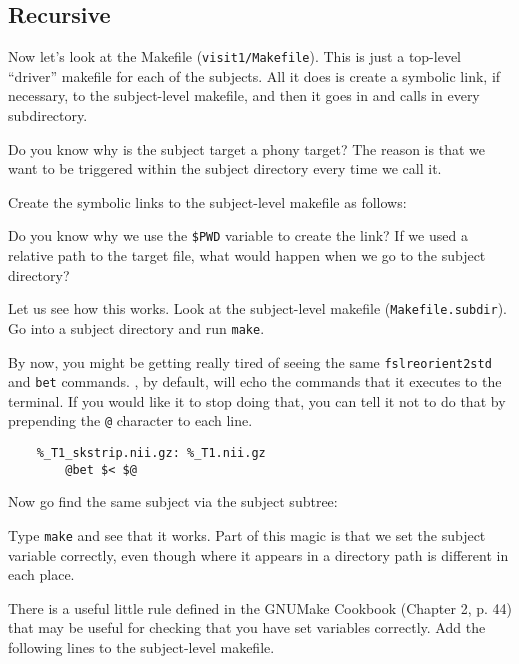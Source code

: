 \subsection{Recursive \maken{}}
Now let's look at the Makefile (\texttt{visit1/Makefile}).  This is just a 
top-level ``driver'' makefile for each of the subjects. All it does is
create a symbolic link, if necessary, to the subject-level makefile,
and then it goes in and calls \maken{} in every subdirectory.

Do you know why is the subject target a phony target? The reason is
that we want \maken{} to be triggered within the subject directory every
time we call it.

Create the symbolic links to the subject-level makefile as follows:

Do you know why we use the \texttt{\$PWD} variable to create the link?
If we used a relative path to the target file, what would happen when
we go to the subject directory?

Let us see how this works. Look at the subject-level makefile (\texttt{Makefile.subdir}). Go into
a subject directory and run \texttt{make}.

By now, you might be getting really tired of seeing the same \texttt{fslreorient2std} and \texttt{bet} commands. \maken{}, by default,
will echo the commands that it executes to the terminal. If you would
like it to stop doing that, you can tell it not to do that by
prepending the \texttt{@} character to each line.
\begin{lstlisting}
	%_T1_skstrip.nii.gz: %_T1.nii.gz
		@bet $< $@
\end{lstlisting}

Now go find the same subject via the subject subtree:

Type \texttt{make} and see that it works. Part of this magic is that we set
the subject variable correctly, even though where it appears in a
directory path is different in each place.

There is a useful little rule defined in the GNUMake Cookbook (Chapter
2, p. 44) that may be useful for checking that you have set variables correctly. Add the following lines to the subject-level makefile.

